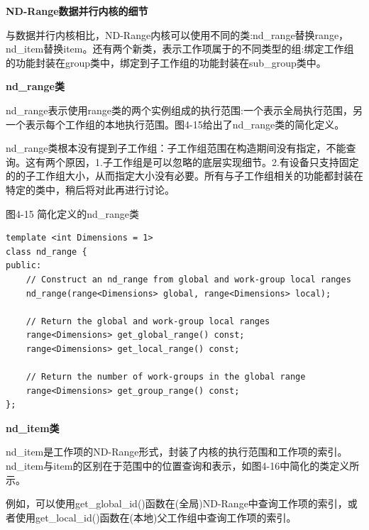 \hspace*{\fill} \par %
\textbf{ND-Range数据并行内核的细节}

与数据并行内核相比，ND-Range内核可以使用不同的类:nd\_range替换range，nd\_item替换item。还有两个新类，表示工作项属于的不同类型的组:绑定工作组的功能封装在group类中，绑定到子工作组的功能封装在sub\_group类中。\par

\hspace*{\fill} \par %
\textbf{nd\_range类}

nd\_range表示使用range类的两个实例组成的执行范围:一个表示全局执行范围，另一个表示每个工作组的本地执行范围。图4-15给出了nd\_range类的简化定义。\par

nd\_range类根本没有提到子工作组：子工作组范围在构造期间没有指定，不能查询。这有两个原因，1.子工作组是可以忽略的底层实现细节。2.有设备只支持固定的的子工作组大小，从而指定大小没有必要。所有与子工作组相关的功能都封装在特定的类中，稍后将对此再进行讨论。\par

\hspace*{\fill} \par %
图4-15 简化定义的nd\_range类
\begin{lstlisting}[caption={}]
template <int Dimensions = 1>
class nd_range {
public:
	// Construct an nd_range from global and work-group local ranges
	nd_range(range<Dimensions> global, range<Dimensions> local);
	
	// Return the global and work-group local ranges
	range<Dimensions> get_global_range() const;
	range<Dimensions> get_local_range() const;
	
	// Return the number of work-groups in the global range
	range<Dimensions> get_group_range() const;
};
\end{lstlisting}

\hspace*{\fill} \par %
\textbf{nd\_item类}

nd\_item是工作项的ND-Range形式，封装了内核的执行范围和工作项的索引。nd\_item与item的区别在于范围中的位置查询和表示，如图4-16中简化的类定义所示。\par

例如，可以使用get\_global\_id()函数在(全局)ND-Range中查询工作项的索引，或者使用get\_local\_id()函数在(本地)父工作组中查询工作项的索引。\par

